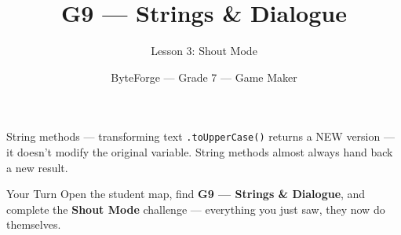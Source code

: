 \documentclass[aspectratio=169]{beamer}
\title{G9 — Strings \& Dialogue}
\subtitle{Lesson 3: Shout Mode}
\author{ByteForge --- Grade 7 --- Game Maker}
\date{}
\begin{document}
\begin{frame}
    \titlepage
\end{frame}

\begin{frame}{String methods — transforming text}
    \Large
    \texttt{.toUpperCase()} returns a NEW version — it doesn't modify the original variable. String methods almost always hand back a new result.
\end{frame}

\begin{frame}{Your Turn}
    \Large
    Open the student map, find \textbf{G9 — Strings \& Dialogue}, and complete
    the \textbf{Shout Mode} challenge --- everything you just saw, they now do themselves.
\end{frame}
\end{document}
